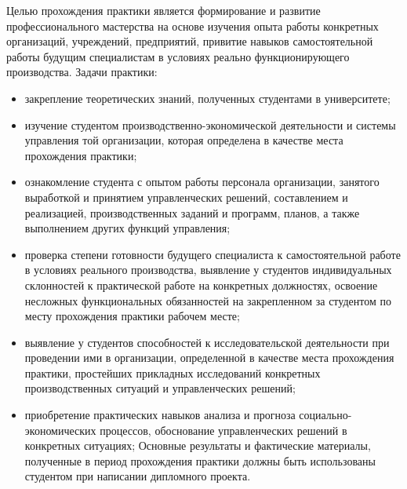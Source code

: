 
Целью прохождения практики является формирование и развитие профессионального мастерства на основе изучения опыта работы конкретных организаций, учреждений, предприятий, привитие навыков самостоятельной работы будущим специалистам в условиях реально функционирующего производства.
Задачи практики:

\begin{itemize}
\item закрепление теоретических знаний, полученных студентами в университете;
\item изучение студентом производственно-экономической деятельности и системы управления той организации, которая определена в качестве места прохождения практики;
\item ознакомление студента с опытом работы персонала организации, занятого выработкой и принятием управленческих решений, составлением и реализацией, производственных заданий и программ, планов, а также выполнением других функций управления;
\item проверка степени готовности будущего специалиста к самостоятельной работе в условиях реального производства, выявление у студентов индивидуальных склонностей к практической работе на конкретных должностях, освоение несложных функциональных обязанностей на закрепленном за студентом по месту прохождения практики рабочем месте;
\item выявление у студентов способностей к исследовательской деятельности при проведении ими в организации, определенной в качестве места прохождения практики, простейших прикладных исследований конкретных производственных ситуаций и управленческих решений;
\item приобретение практических навыков анализа и прогноза социально-экономических процессов, обоснование управленческих решений в конкретных ситуациях;
Основные результаты и фактические материалы, полученные в период прохождения практики должны быть использованы студентом при написании дипломного проекта.
\end{itemize}